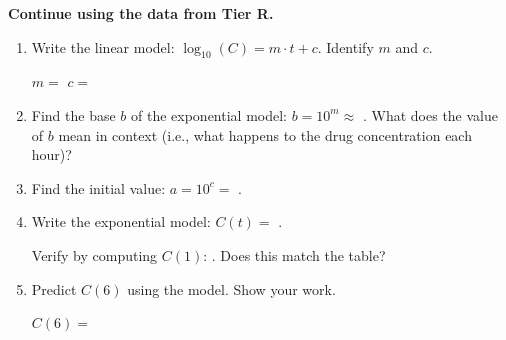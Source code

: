 \documentclass[10pt]{article}
\begin{document}
\vspace{0.1in}

\begin{tcolorbox}[colback=white, colframe=black!40,
    title=\textbf{Tier A --- Approaching Proficiency},
    fonttitle=\bfseries, arc=2mm, left=3mm, right=3mm, top=2mm, bottom=2mm]

\textbf{Continue using the data from Tier R.}

\begin{enumerate}[leftmargin=1.8em, itemsep=10pt]

\item Write the linear model: $\log_{10}(C) = m\cdot t + c$.  Identify $m$ and $c$.

\vspace{4pt}
$m = $ \blank{3cm} \qquad $c = $ \blank{3cm}

\item Find the base $b$ of the exponential model: $b = 10^m \approx $ \blank{2cm}.
      What does the value of $b$ mean in context (i.e., what happens to the drug
      concentration each hour)?

\writeline

\item Find the initial value: $a = 10^c = $ \blank{2cm}.

\item Write the exponential model: $C(t) = $ \blank{5cm}.

      Verify by computing $C(1)$: \blank{4cm}. Does this match the table? \blank{1.5cm}

\item Predict $C(6)$ using the model.  Show your work.

\vspace{4pt}
$C(6) = $ \blank{5cm}

\end{enumerate}
\end{tcolorbox}

\vspace{0.1in}
\end{document}
